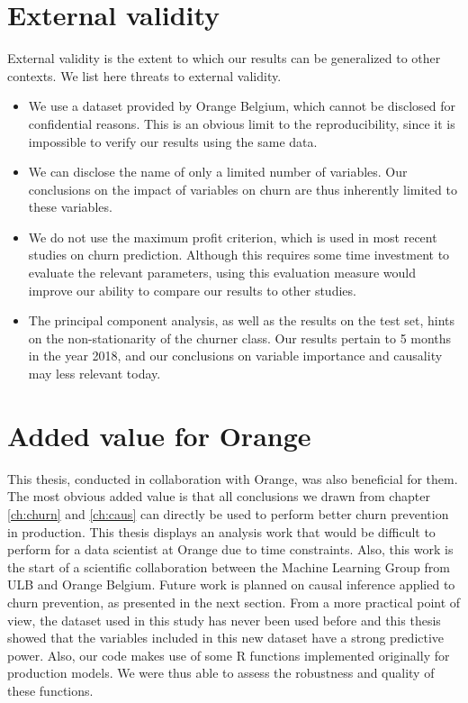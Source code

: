 \section{External validity}
\label{sec:ext_val}

External validity is the extent to which our results can be generalized to other
contexts. We list here threats to external validity.

\begin{itemize}
	\item We use a dataset provided by Orange Belgium, which cannot be disclosed
	for confidential reasons. This is an obvious limit to the reproducibility,
	since it is impossible to verify our results using the same data.

	\item We can disclose the name of only a limited number of variables. Our
	conclusions on the impact of variables on churn are thus inherently limited
	to these variables.

	\item We do not use the maximum profit criterion, which is used in most
	recent studies on churn prediction. Although this requires some time
	investment to evaluate the relevant parameters, using this evaluation
	measure would improve our ability to compare our results to other studies.

	\item The principal component analysis, as well as the results on the test
	set, hints on the non-stationarity of the churner class. Our results pertain
	to 5 months in the year 2018, and our conclusions on variable importance and
	causality may less relevant today.

\end{itemize}

\section{Added value for Orange}

This thesis, conducted in collaboration with Orange, was also beneficial for
them. The most obvious added value is that all conclusions we drawn from chapter
\ref{ch:churn} and \ref{ch:caus} can directly be used to perform better churn
prevention in production. This thesis displays an analysis work that would be
difficult to perform for a data scientist at Orange due to time constraints.
Also, this work is the start of a scientific collaboration between the Machine
Learning Group from ULB and Orange Belgium. Future work is planned on causal
inference applied to churn prevention, as presented in the next section. From a
more practical point of view, the dataset used in this study has never been used
before and this thesis showed that the variables included in this new dataset
have a strong predictive power. Also, our code makes use of some R functions
implemented originally for production models. We were thus able to assess the
robustness and quality of these functions.

